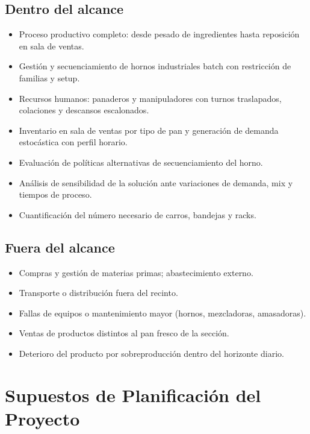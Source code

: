 \documentclass[12pt]{article}
\begin{document}
\subsection{Dentro del alcance}
\begin{itemize}
  \item Proceso productivo completo: desde pesado de ingredientes hasta reposición en sala de ventas.
  \item Gestión y secuenciamiento de hornos industriales batch con restricción de familias y setup.
  \item Recursos humanos: panaderos y manipuladores con turnos traslapados, colaciones y descansos escalonados.
  \item Inventario en sala de ventas por tipo de pan y generación de demanda estocástica con perfil horario.
  \item Evaluación de políticas alternativas de secuenciamiento del horno.
  \item Análisis de sensibilidad de la solución ante variaciones de demanda, mix y tiempos de proceso.
  \item Cuantificación del número necesario de carros, bandejas y racks.
\end{itemize}

\subsection{Fuera del alcance}
\begin{itemize}
  \item Compras y gestión de materias primas; abastecimiento externo.
  \item Transporte o distribución fuera del recinto.
  \item Fallas de equipos o mantenimiento mayor (hornos, mezcladoras, amasadoras).
  \item Ventas de productos distintos al pan fresco de la sección.
  \item Deterioro del producto por sobreproducción dentro del horizonte diario.
\end{itemize}
\newpage

\section{Supuestos de Planificación del Proyecto}
\end{document}
